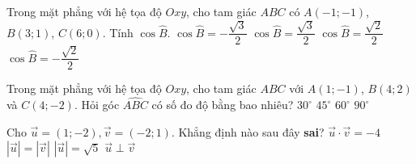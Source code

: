 \begin{ex}%
	Trong mặt phẳng với hệ tọa độ $Oxy$, cho tam giác $ABC$ có $A(-1;-1)$, $B(3;1)$, $C(6;0)$. Tính $\cos \widehat{B}$.
	\choice
	{$\cos\widehat{B}=-\dfrac{\sqrt{3}}{2}$}
	{$\cos\widehat{B}=\dfrac{\sqrt{3}}{2}$}
	{$\cos\widehat{B}=\dfrac{\sqrt{2}}{2}$}
	{\True $\cos\widehat{B}=-\dfrac{\sqrt{2}}{2}$}
\end{ex}

\begin{ex}%
	Trong mặt phẳng với hệ tọa độ $Oxy$, cho tam giác $ABC$ với $A(1;-1)$, $B(4;2)$ và $C(4;-2)$. Hỏi góc $\widehat{ABC}$ có số đo độ bằng bao nhiêu?
	\choice
	{$30^{\circ}$}
	{\True$45^{\circ}$}
	{$60^{\circ}$}
	{$90^{\circ}$}
\end{ex}

\begin{ex}%
	Cho $\overrightarrow{u}=(1;-2),\overrightarrow{v}=(-2;1)$. Khẳng định nào sau đây \textbf{sai}?
	\choice
	{$\overrightarrow{u}\cdot\overrightarrow{v}=-4$}
	{$|\overrightarrow{u}|=|\overrightarrow{v}|$}
	{$|\overrightarrow{u}|=\sqrt{5}$}
	{\True $\overrightarrow{u} \perp \overrightarrow{v}$}
\end{ex}

